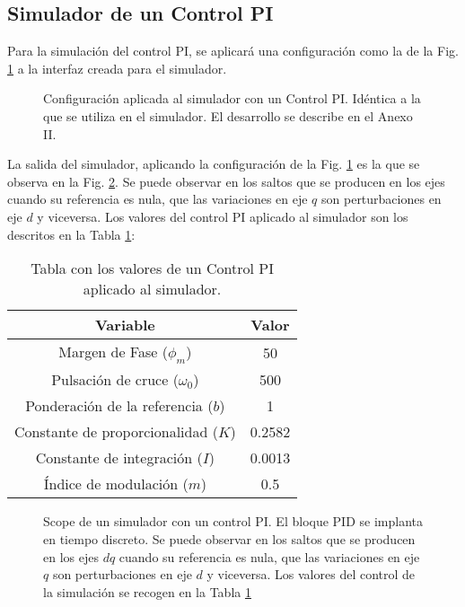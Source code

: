 \documentclass{report}
\begin{document}
\clearpage
\subsection{Simulador de un Control PI} \label{sec.simuladorcontrolPI}

Para la simulación del control PI, se aplicará una configuración como la de la Fig. \ref{fig.simulador_pi} a la interfaz creada para el simulador.

\begin{figure}[!h]
    \centering
    \caption{Configuración aplicada al simulador con un Control PI. Idéntica a la que se utiliza en el simulador. El desarrollo se describe en el Anexo II.}
    \label{fig.simulador_pi}
\end{figure} 


La salida del simulador, aplicando la configuración de la Fig. \ref{fig.simulador_pi} es la que se observa en la Fig. \ref{fig.scope_simulador_pi}. Se puede observar en los saltos que se producen en los ejes cuando su referencia es nula, que las variaciones en eje $q$ son perturbaciones en eje $d$ y viceversa.  Los valores del control PI aplicado al simulador son los descritos en la Tabla \ref{tab.datossimuladorpi}:

\begin{table}[!h]
    \begin{center}
    \begin{tabular}{|c|c|} \hline\hline\hline
    \textbf{Variable} & \textbf{Valor} \\ \hline
    Margen de Fase ($\phi_{m}$) & 50 \\ \hline
    Pulsación de cruce ($\omega_{0}$) & 500 \\ \hline
    Ponderación de la referencia ($b$) & 1 \\ \hline 
    Constante de proporcionalidad ($K$) & 0.2582 \\ \hline 
    Constante de integración ($I$) & 0.0013 \\ \hline 
    Índice de modulación ($m$) & 0.5 \\ \hline

    \end{tabular}
    \end{center}
    \caption{Tabla con los valores de un Control PI aplicado al simulador.} \label{tab.datossimuladorpi}
\end{table}


\begin{figure}[!h]
    \centering
    \caption{Scope de un simulador con un control PI. El bloque PID se implanta en tiempo discreto. Se puede observar en los saltos que se producen en los ejes $dq$ cuando su referencia es nula, que las variaciones en eje $q$ son perturbaciones en eje $d$ y viceversa. Los valores del control de la simulación se recogen en la Tabla \ref{tab.datossimuladorpi}}
    \label{fig.scope_simulador_pi}
\end{figure} 
\end{document}
